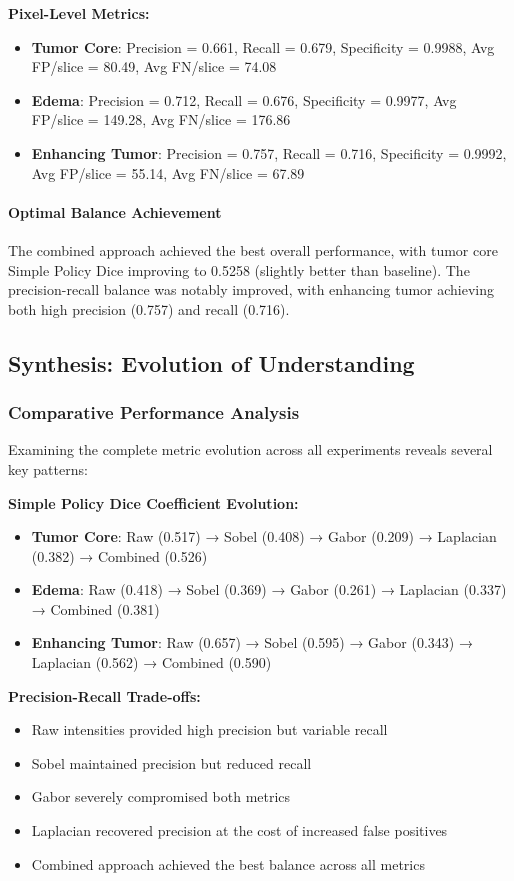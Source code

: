 \textbf{Pixel-Level Metrics:}
\begin{itemize}
    \item \textbf{Tumor Core}: Precision = 0.661, Recall = 0.679, Specificity = 0.9988, Avg FP/slice = 80.49, Avg FN/slice = 74.08
    \item \textbf{Edema}: Precision = 0.712, Recall = 0.676, Specificity = 0.9977, Avg FP/slice = 149.28, Avg FN/slice = 176.86
    \item \textbf{Enhancing Tumor}: Precision = 0.757, Recall = 0.716, Specificity = 0.9992, Avg FP/slice = 55.14, Avg FN/slice = 67.89
\end{itemize}

\paragraph{Optimal Balance Achievement} The combined approach achieved the best overall performance, with tumor core Simple Policy Dice improving to 0.5258 (slightly better than baseline). The precision-recall balance was notably improved, with enhancing tumor achieving both high precision (0.757) and recall (0.716).

\subsection{Synthesis: Evolution of Understanding}

\subsubsection{Comparative Performance Analysis}

Examining the complete metric evolution across all experiments reveals several key patterns:

\textbf{Simple Policy Dice Coefficient Evolution:}
\begin{itemize}
    \item \textbf{Tumor Core}: Raw (0.517) → Sobel (0.408) → Gabor (0.209) → Laplacian (0.382) → Combined (0.526)
    \item \textbf{Edema}: Raw (0.418) → Sobel (0.369) → Gabor (0.261) → Laplacian (0.337) → Combined (0.381)
    \item \textbf{Enhancing Tumor}: Raw (0.657) → Sobel (0.595) → Gabor (0.343) → Laplacian (0.562) → Combined (0.590)
\end{itemize}

\textbf{Precision-Recall Trade-offs:}
\begin{itemize}
    \item Raw intensities provided high precision but variable recall
    \item Sobel maintained precision but reduced recall
    \item Gabor severely compromised both metrics
    \item Laplacian recovered precision at the cost of increased false positives
    \item Combined approach achieved the best balance across all metrics
\end{itemize}

